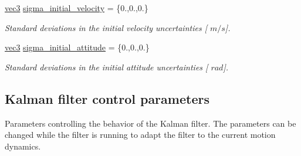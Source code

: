 \begin{DoxyCompactItemize}
\hyperlink{nav__types_8h_a90c683614d896321009d3b3c401b764f}{vec3} \hyperlink{group__nav__eq_ga5abe69320e5702cb7f4b79abb9bcf297}{sigma\-\_\-initial\-\_\-velocity} = \{0.,0.,0.\}
\begin{DoxyCompactList}\small\item\em \-Standard deviations in the initial velocity uncertainties \mbox{[} $m/s$\mbox{]}. \end{DoxyCompactList}\item 
\hyperlink{nav__types_8h_a90c683614d896321009d3b3c401b764f}{vec3} \hyperlink{group__nav__eq_gaad9757cf97cfd938818e7785a3beafe1}{sigma\-\_\-initial\-\_\-attitude} = \{0.,0.,0.\}
\begin{DoxyCompactList}\small\item\em \-Standard deviations in the initial attitude uncertainties \mbox{[} $rad$\mbox{]}. \end{DoxyCompactList}\end{DoxyCompactItemize}
\subsection*{\-Kalman filter control parameters}
\label{_amgrp5a5d8141c51eafd0fafa7b9cf62a2515}%
 \-Parameters controlling the behavior of the \-Kalman filter. \-The parameters can be changed while the filter is running to adapt the filter to the current motion dynamics.

